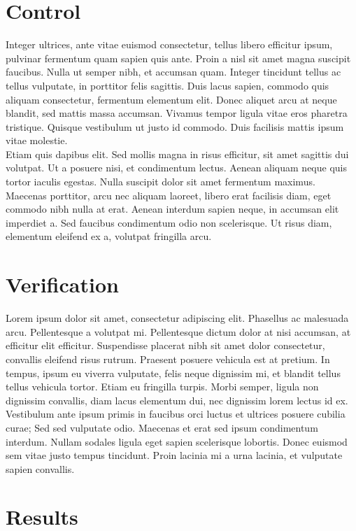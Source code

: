 \documentclass[a4paper, 11pt] {article}
\begin{document}
\section{Control}

 Integer ultrices, ante vitae euismod consectetur, tellus libero efficitur ipsum, pulvinar fermentum quam sapien quis ante. Proin a nisl sit amet magna suscipit faucibus. Nulla ut semper nibh, et accumsan quam. Integer tincidunt tellus ac tellus vulputate, in porttitor felis sagittis. Duis lacus sapien, commodo quis aliquam consectetur, fermentum elementum elit. Donec aliquet arcu at neque blandit, sed mattis massa accumsan. Vivamus tempor ligula vitae eros pharetra tristique. Quisque vestibulum ut justo id commodo. Duis facilisis mattis ipsum vitae molestie.
\\
Etiam quis dapibus elit. Sed mollis magna in risus efficitur, sit amet sagittis dui volutpat. Ut a posuere nisi, et condimentum lectus. Aenean aliquam neque quis tortor iaculis egestas. Nulla suscipit dolor sit amet fermentum maximus. Maecenas porttitor, arcu nec aliquam laoreet, libero erat facilisis diam, eget commodo nibh nulla at erat. Aenean interdum sapien neque, in accumsan elit imperdiet a. Sed faucibus condimentum odio non scelerisque. Ut risus diam, elementum eleifend ex a, volutpat fringilla arcu. 


\section{Verification}

Lorem ipsum dolor sit amet, consectetur adipiscing elit. Phasellus ac malesuada arcu. Pellentesque a volutpat mi. Pellentesque dictum dolor at nisi accumsan, at efficitur elit efficitur. Suspendisse placerat nibh sit amet dolor consectetur, convallis eleifend risus rutrum. Praesent posuere vehicula est at pretium. In tempus, ipsum eu viverra vulputate, felis neque dignissim mi, et blandit tellus tellus vehicula tortor. Etiam eu fringilla turpis. Morbi semper, ligula non dignissim convallis, diam lacus elementum dui, nec dignissim lorem lectus id ex. Vestibulum ante ipsum primis in faucibus orci luctus et ultrices posuere cubilia curae; Sed sed vulputate odio. Maecenas et erat sed ipsum condimentum interdum. Nullam sodales ligula eget sapien scelerisque lobortis. Donec euismod sem vitae justo tempus tincidunt. Proin lacinia mi a urna lacinia, et vulputate sapien convallis. 



\section{Results}
\end{document}
